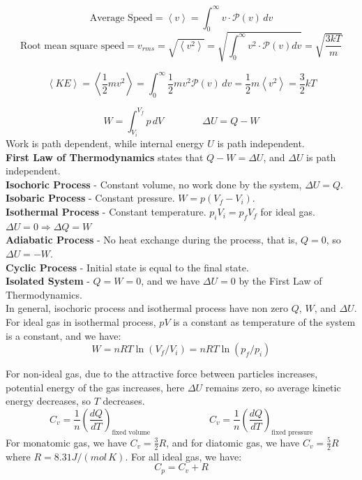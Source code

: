 \documentclass[10pt]{article}
\theoremstyle{break}
\theoremstyle{break}
\newcommand{\Power}{\mathcal{P}}
\begin{document}
$$\text{Average Speed} = \left<v\right> = \int_{0}^\infty v\cdot \Power(v)\, dv$$
$$\text{Root mean square speed} = v_{rms} = \sqrt{\left<v^2\right>} = \sqrt{\int_0^\infty v^2\cdot \Power(v)dv} = \sqrt{\frac{3kT}{m}}$$

$$\left<KE\right> = \left<\frac{1}{2}mv^2\right> = \int_{0}^\infty \frac{1}{2}mv^2\Power(v)\, dv = \frac{1}{2}m\left<v^2\right> = \frac{3}{2}kT$$

$$W= \int_{V_i}^{V_f} p\, dV \qquad \qquad \Delta U = Q-W$$
Work is path dependent, while internal energy $U$ is path independent. \\

\textbf{First Law of Thermodynamics} states that $Q-W = \Delta U$, and $\Delta U$ is path independent.\\

\textbf{Isochoric Process} - Constant volume, no work done by the system, $\Delta U = Q$.\\
\textbf{Isobaric Process} - Constant pressure. $W = p(V_f - V_i)$.\\
\textbf{Isothermal Process} - Constant temperature. $p_iV_i = p_fV_f$ for ideal gas. $\Delta U = 0 \Rightarrow \Delta Q = W$\\
\textbf{Adiabatic Process} - No heat exchange during the process, that is, $Q= 0$, so $\Delta U = -W$.\\
\textbf{Cyclic Process} - Initial state is equal to the final state.\\
\textbf{Isolated System} - $Q = W = 0$, and we have $\Delta U = 0$ by the First Law of Thermodynamics. \\

In general, isochoric process and isothermal process have non zero $Q$, $W$, and $\Delta U$. 
For ideal gas in isothermal process, $pV$ is a constant as temperature of the system is a constant, and we have:
$$W = nRT\ln(V_f/V_i) = nRT\ln(p_f/p_i)$$

For non-ideal gas, due to the attractive force between particles increases, potential energy of the gas increases, here $\Delta U$ remains zero, so average kinetic energy decreases, so $T$ decreases.\\

$$C_v = \frac{1}{n}\left(\frac{dQ}{dT}\right)_{\text{fixed volume}} \qquad\qquad\qquad C_v = \frac{1}{n}\left(\frac{dQ}{dT}\right)_{\text{fixed pressure}}$$
For monatomic gas, we have $C_v = \frac{3}{2}R$, and for diatomic gas, we have $C_v = \frac{5}{2}R$ where $R = 8.31 J/(mol\,K)$. For all ideal gas, we have: $$C_p = C_v+R$$
\end{document}
